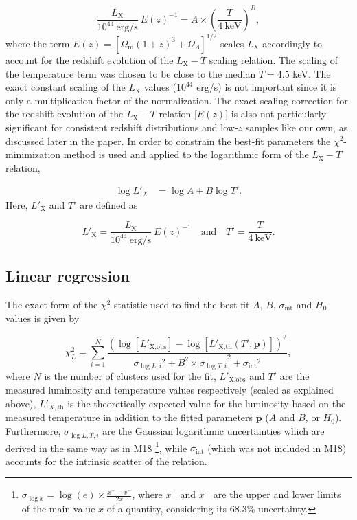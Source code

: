 \documentclass{aa}   %
\begin{document}
\begin{equation}
\frac{L_{\text{X}}}{10^{44}\ \text{erg/s}}\ E(z)^{-1}=A \times \left(\frac{T}{4\ \text{keV}}\right)^B,
\label{eq1}
\end{equation}
where the term $E(z)=[\Omega_\text{m}(1+z)^3+\Omega_{\Lambda}]^{1/2}$ scales $L_{\text{X}}$ accordingly to account for the redshift evolution of the $L_{\text{X}}-T$ scaling relation. The scaling of the temperature term was chosen to be close to the median $T=4.5$ keV. The exact constant scaling of the $L_{\text{X}}$ values ($10^{44}$ erg/s) is not important since it is only a multiplication factor of the normalization. The exact scaling correction for the redshift evolution of the $L_{\text{X}}-T$ relation [$E(z)$] is also not particularly significant for consistent redshift distributions and low-$z$ samples like our own, as discussed later in the paper.
In order to constrain the best-fit parameters the $\chi^2$-minimization method is used and applied to the logarithmic form of the $L_{\text{X}}-T$ relation,

\begin{equation}
\begin{aligned}
\log{L'_X}&=\log{A}+B\log{T'}.
\label{eq2}
\end{aligned}
\end{equation}
Here, $L'_{\text{X}}$ and $T'$ are defined as

\begin{equation}
L'_{\text{X}}=\dfrac{L_{\text{X}}}{10^{44}\ \text{erg/s}}\ E(z)^{-1}\quad \text{and}\quad T'=\dfrac{T}{4\ \text{keV}}.
\end{equation}

\subsection{Linear regression}\label{fitting}

The exact form of the $\chi^2$-statistic used to find the best-fit $A$, $B$, $\sigma_{\text{int}}$ and $H_0$ values is given by

\begin{equation}
\chi^2_L=\sum\limits_{i=1}^N\frac{\left(\log{[L'_{{\text{X}},\text{obs}}]}-\log{[L'_{{\text{X}},\text{th}}(T',\mathbf{p})]}\right)^2}{{\sigma _{\log{L},i}}^2+{B^2\times \sigma _{\log{T},i}}^2+{\sigma_{\text{int}}}^2},
\label{eq3}
\end{equation}
where $N$ is the number of clusters used for the fit, $L'_{\text{X,obs}}$ and $T'$ are the measured luminosity and temperature values respectively (scaled as explained above), $L'_{X,\text{th}}$ is the theoretically expected value for the luminosity based on the measured temperature in addition to the fitted parameters $\mathbf{p}$ ($A$ and $B$, or $H_0$). Furthermore, $\sigma _{\log{L,T,i}}$ are the Gaussian logarithmic uncertainties which are derived in the same way as in M18 \footnote{$\sigma_{\log{x}}=\log{(e)}\times \frac{x^+-x^-}{2x}$, where $x^+$ and $x^-$ are the upper and lower limits of the main value $x$ of a quantity, considering its 68.3\% uncertainty.}, while $\sigma_{\text{int}}$ (which was not included in M18) accounts for the intrinsic scatter of the relation. 
\end{document}
